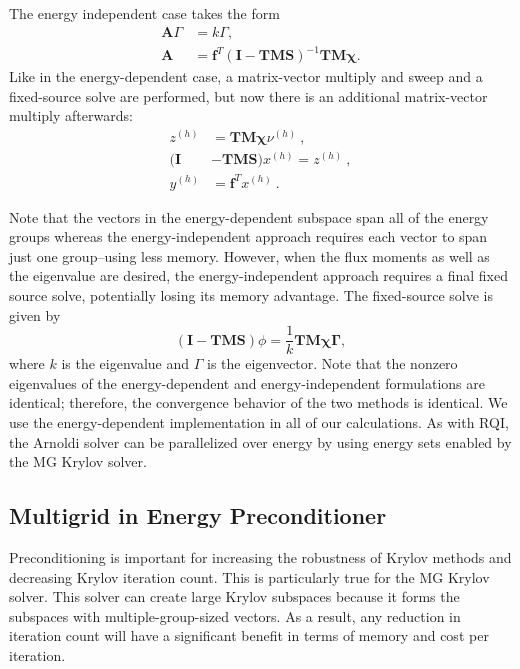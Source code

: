 \documentclass{article}                                                                           %
\begin{document}
The energy independent case takes the form
\begin{equation}
\begin{split}
\mathbf{A}\Gamma &= k\Gamma, \\
\mathbf{A} &= \mathbf{f}^T(\mathbf{I - TMS})^{-1}\mathbf{TM\chi}.
\end{split}
\end{equation}
Like in the energy-dependent case, a matrix-vector multiply and sweep and a fixed-source solve are performed, but now there is an additional matrix-vector multiply afterwards:
\begin{align}
z^{(h)} &= \mathbf{TM\chi}\nu^{(h)}\:,\\
%
(\mathbf{I} &- \mathbf{TMS})x^{(h)} = z^{(h)}\:,\\
%
y^{(h)} &= \mathbf{f}^Tx^{(h)}\:.
\end{align}

Note that the vectors in the energy-dependent subspace span all of the energy groups whereas the energy-independent approach requires each vector to span just one group--using less memory. However, when the flux moments as well as the eigenvalue are desired, the energy-independent approach requires a final fixed source solve, potentially losing its memory advantage. The fixed-source solve is given by
\begin{equation}
(\mathbf{I} - \mathbf{TMS})\phi = \frac{1}{k}\mathbf{TM\chi\Gamma},
\end{equation}
where $k$ is the eigenvalue and $\Gamma$ is the eigenvector. Note that the nonzero eigenvalues of the energy-dependent and energy-independent formulations are identical; therefore, the convergence behavior of the two methods is identical.  We use the energy-dependent implementation in all of our calculations. As with RQI, the Arnoldi solver can be parallelized over energy by using energy sets enabled by the MG Krylov solver.


\subsection{Multigrid in Energy Preconditioner}
\label{sec:precond}
Preconditioning is important for increasing the robustness of Krylov methods and decreasing Krylov iteration count. This is particularly true for the MG Krylov solver. This solver can create large Krylov subspaces because it forms the subspaces with multiple-group-sized vectors. As a result, any reduction in iteration count will have a significant benefit in terms of memory and cost per iteration. 
 
\end{document}

